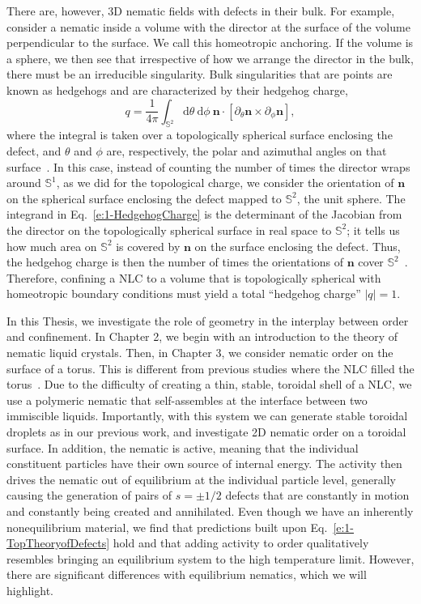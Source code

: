 There are, however, 3D nematic fields with defects in their bulk.
For example, consider a nematic inside a volume with the director at the surface of the volume perpendicular to the surface.
We call this homeotropic anchoring.
If the volume is a sphere, we then see that irrespective of how we arrange the director in the bulk, there must be an irreducible singularity.
Bulk singularities that are points are known as hedgehogs and are characterized by their hedgehog charge,
\begin{equation}
  q = \frac{1}{4 \pi} \int_{\mathbb{S}^2} \textrm{d}\theta \: \textrm{d}\phi \: \mathbf{n} \cdot \left [ \partial_{\theta} \mathbf{n} \times \partial_{\phi} \mathbf{n} \right ],\label{e:1-HedgehogCharge}
\end{equation}
where the integral is taken over a topologically spherical surface enclosing the defect, and $\theta$ and $\phi$ are, respectively, the polar and azimuthal angles on that surface~\cite{RN153}.
In this case, instead of counting the number of times the director wraps around $\mathbb{S}^1$, as we did for the topological charge, we consider the orientation of $\mathbf{n}$ on the spherical surface enclosing the defect mapped to $\mathbb{S}^2$, the unit sphere.
The integrand in Eq.~\ref{e:1-HedgehogCharge} is the determinant of the Jacobian from the director on the topologically spherical surface in real space to $\mathbb{S}^2$; it tells us how much area on $\mathbb{S}^2$ is covered by $\mathbf{n}$ on the surface enclosing the defect.
Thus, the hedgehog charge is then the number of times the orientations of $\mathbf{n}$ cover $\mathbb{S}^2$~\cite{RN153}.
Therefore, confining a NLC to a volume that is topologically spherical with homeotropic boundary conditions must yield a total ``hedgehog charge'' $|q|=1$.

In this Thesis, we investigate the role of geometry in the interplay between order and confinement.
In Chapter 2, we begin with an introduction to the theory of nematic liquid crystals.
Then, in Chapter 3, we consider nematic order on the surface of a torus.
This is different from previous studies where the NLC filled the torus~\cite{RN24,RN274,RN44}.
Due to the difficulty of creating a thin, stable, toroidal shell of a NLC, we use a polymeric nematic that self-assembles at the interface between two immiscible liquids.
Importantly, with this system we can generate stable toroidal droplets as in our previous work, and investigate 2D nematic order on a toroidal surface.
In addition, the nematic is active, meaning that the individual constituent particles have their own source of internal energy.
The activity then drives the nematic out of equilibrium at the individual particle level, generally causing the generation of pairs of $s = \pm 1/2$ defects that are constantly in motion and constantly being created and annihilated.
Even though we have an inherently nonequilibrium material, we find that predictions built upon Eq.~\ref{e:1-TopTheoryofDefects} hold and that adding activity to order qualitatively resembles bringing an equilibrium system to the high temperature limit.
However, there are significant differences with equilibrium nematics, which we will highlight.

